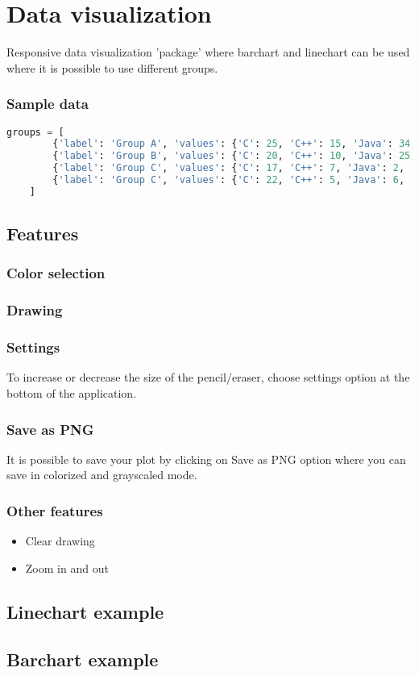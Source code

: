 \section{Data visualization}
Responsive data visualization 'package' where barchart and linechart can be used where it is possible to use different groups.

\subsubsection*{Sample data}
\begin{lstlisting}[language=python]
    groups = [
        {'label': 'Group A', 'values': {'C': 25, 'C++': 15, 'Java': 34, 'Python': 40}},
        {'label': 'Group B', 'values': {'C': 20, 'C++': 10, 'Java': 25, 'Python': 30}},
        {'label': 'Group C', 'values': {'C': 17, 'C++': 7, 'Java': 2, 'Python': 8}},
        {'label': 'Group C', 'values': {'C': 22, 'C++': 5, 'Java': 6, 'Python': 11}}
    ]
\end{lstlisting}

\clearpage
\subsection{Features}
\subsubsection*{Color selection}

\subsubsection*{Drawing}

\clearpage
\subsubsection*{Settings}
To increase or decrease the size of the pencil/eraser, choose settings option at the bottom of the application.

\subsubsection*{Save as PNG}
It is possible to save your plot by clicking on Save as PNG option where you can save in colorized and grayscaled mode.

\subsubsection*{Other features}
\begin{itemize}
    \item Clear drawing
    \item Zoom in and out
\end{itemize}

\subsection{Linechart example}

\subsection{Barchart example}
